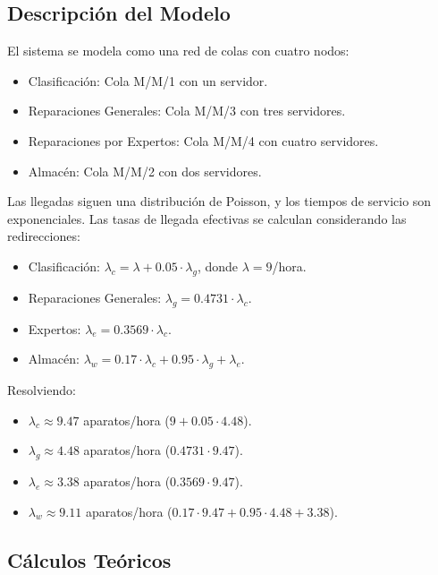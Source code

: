 \documentclass[12pt]{article}
\begin{document}
\subsection{Descripción del Modelo}
El sistema se modela como una red de colas con cuatro nodos:
\begin{itemize}
    \item Clasificación: Cola M/M/1 con un servidor.
    \item Reparaciones Generales: Cola M/M/3 con tres servidores.
    \item Reparaciones por Expertos: Cola M/M/4 con cuatro servidores.
    \item Almacén: Cola M/M/2 con dos servidores.
\end{itemize}
Las llegadas siguen una distribución de Poisson, y los tiempos de servicio son exponenciales. Las tasas de llegada efectivas se calculan considerando las redirecciones:
\begin{itemize}
    \item Clasificación: $\lambda_c = \lambda + 0.05 \cdot \lambda_g$, donde $\lambda = 9$/hora.
    \item Reparaciones Generales: $\lambda_g = 0.4731 \cdot \lambda_c$.
    \item Expertos: $\lambda_e = 0.3569 \cdot \lambda_c$.
    \item Almacén: $\lambda_w = 0.17 \cdot \lambda_c + 0.95 \cdot \lambda_g + \lambda_e$.
\end{itemize}
Resolviendo:
\begin{itemize}
    \item $\lambda_c \approx 9.47$ aparatos/hora ($9 + 0.05 \cdot 4.48$).
    \item $\lambda_g \approx 4.48$ aparatos/hora ($0.4731 \cdot 9.47$).
    \item $\lambda_e \approx 3.38$ aparatos/hora ($0.3569 \cdot 9.47$).
    \item $\lambda_w \approx 9.11$ aparatos/hora ($0.17 \cdot 9.47 + 0.95 \cdot 4.48 + 3.38$).
\end{itemize}

\subsection{Cálculos Teóricos}
\end{document}

